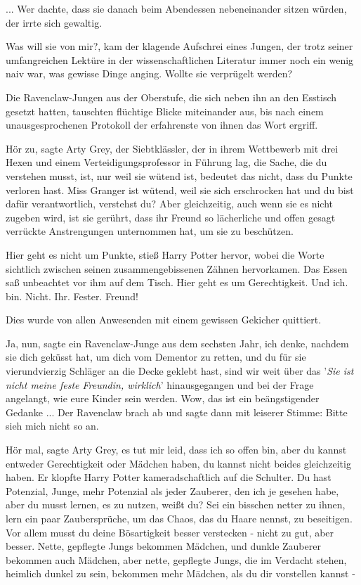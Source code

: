 ... Wer dachte, dass sie danach beim Abendessen nebeneinander sitzen würden, der
irrte sich gewaltig.

\glqq{}Was will sie von mir?\grqq{}, kam der klagende Aufschrei eines Jungen, der
trotz seiner umfangreichen Lektüre in der wissenschaftlichen Literatur immer
noch ein wenig naiv war, was gewisse Dinge anging. \glqq{}Wollte sie verprügelt
werden?\grqq{}

Die Ravenclaw-Jungen aus der Oberstufe, die sich neben ihn an den Esstisch
gesetzt hatten, tauschten flüchtige Blicke miteinander aus, bis nach einem
unausgesprochenen Protokoll der erfahrenste von ihnen das Wort ergriff.

\glqq{}Hör zu\grqq{}, sagte Arty Grey, der Siebtklässler, der in ihrem Wettbewerb
mit drei Hexen und einem Verteidigungsprofessor in Führung lag, \glqq{}die Sache,
die du verstehen musst, ist, nur weil sie wütend ist, bedeutet das nicht, dass
du Punkte verloren hast. Miss Granger ist wütend, weil sie sich erschrocken hat
und du bist dafür verantwortlich, verstehst du? Aber gleichzeitig, auch wenn sie
es nicht zugeben wird, ist sie gerührt, dass ihr Freund so lächerliche und offen
gesagt verrückte Anstrengungen unternommen hat, um sie zu beschützen.\grqq{}

\glqq{}Hier geht es nicht um Punkte\grqq{}, stieß Harry Potter hervor, wobei die
Worte sichtlich zwischen seinen zusammengebissenen Zähnen hervorkamen. Das Essen
saß unbeachtet vor ihm auf dem Tisch. \glqq{}Hier geht es um Gerechtigkeit. Und
ich. bin. Nicht. Ihr. Fester. Freund!\grqq{}

Dies wurde von allen Anwesenden mit einem gewissen Gekicher quittiert.

\glqq{}Ja, nun\grqq{}, sagte ein Ravenclaw-Junge aus dem sechsten Jahr, \glqq{}ich
denke, nachdem sie dich geküsst hat, um dich vom Dementor zu retten, und du für
sie vierundvierzig Schläger an die Decke geklebt hast, sind wir weit über das
'\emph{Sie ist nicht meine feste Freundin, wirklich}' hinausgegangen und bei der
Frage angelangt, wie eure Kinder sein werden. Wow, das ist ein beängstigender
Gedanke ...\grqq{} Der Ravenclaw brach ab und sagte dann mit leiserer Stimme:
\glqq{}Bitte sieh mich nicht so an.\grqq{}

\glqq{}Hör mal\grqq{}, sagte Arty Grey, \glqq{}es tut mir leid, dass ich so offen
bin, aber du kannst entweder Gerechtigkeit oder Mädchen haben, du kannst nicht
beides gleichzeitig haben.\grqq{} Er klopfte Harry Potter kameradschaftlich auf
die Schulter. \glqq{}Du hast Potenzial, Junge, mehr Potenzial als jeder Zauberer,
den ich je gesehen habe, aber du musst lernen, es zu nutzen, weißt du? Sei ein
bisschen netter zu ihnen, lern ein paar Zaubersprüche, um das Chaos, das du
Haare nennst, zu beseitigen. Vor allem musst du deine Bösartigkeit besser
verstecken - nicht zu gut, aber besser. Nette, gepflegte Jungs bekommen Mädchen,
und dunkle Zauberer bekommen auch Mädchen, aber nette, gepflegte Jungs, die im
Verdacht stehen, heimlich dunkel zu sein, bekommen mehr Mädchen, als du dir
vorstellen kannst -\grqq{}

